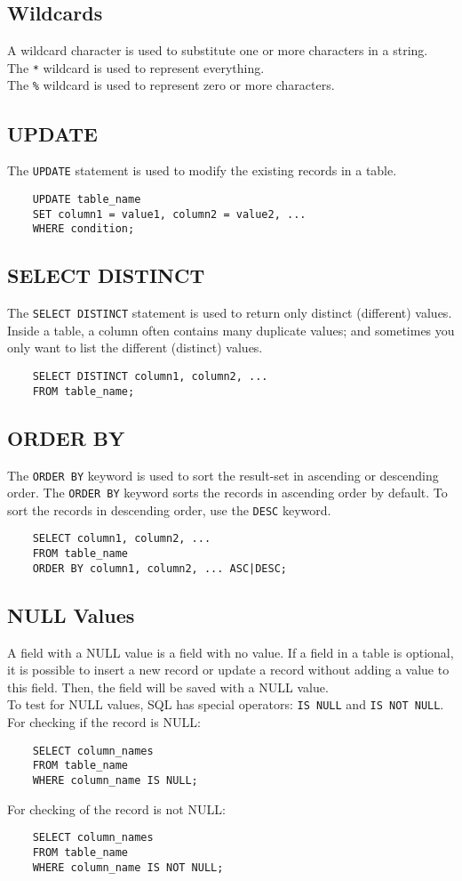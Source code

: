 \documentclass{thomasClass}
\begin{document}
\subsection{Wildcards}
A wildcard character is used to substitute one or more characters in a string.\\
The \verb|*| wildcard is used to represent everything.\\
The \verb|%| wildcard is used to represent zero or more characters.

\subsection{UPDATE}
The \verb|UPDATE| statement is used to modify the existing records in a table.
\begin{verbatim}
    UPDATE table_name
    SET column1 = value1, column2 = value2, ...
    WHERE condition;
\end{verbatim}

\subsection{SELECT DISTINCT}
The \verb|SELECT DISTINCT| statement is used to return only distinct (different) values. Inside a table, a column often contains many duplicate values; and sometimes you only want to list the different (distinct) values.
\begin{verbatim}
    SELECT DISTINCT column1, column2, ...
    FROM table_name;
\end{verbatim}

\subsection{ORDER BY}
The \verb|ORDER BY| keyword is used to sort the result-set in ascending or descending order. The \verb|ORDER BY| keyword sorts the records in ascending order by default. To sort the records in descending order, use the \verb|DESC| keyword.
\begin{verbatim}
    SELECT column1, column2, ...
    FROM table_name
    ORDER BY column1, column2, ... ASC|DESC;
\end{verbatim}

\subsection{NULL Values}
A field with a NULL value is a field with no value. If a field in a table is optional, it is possible to insert a new record or update a record without adding a value to this field. Then, the field will be saved with a NULL value.\\
To test for NULL values, SQL has special operators: \verb|IS NULL| and \verb|IS NOT NULL|.\\
For checking if the record is NULL:
\begin{verbatim}
    SELECT column_names
    FROM table_name
    WHERE column_name IS NULL;
\end{verbatim}
For checking of the record is not NULL:
\begin{verbatim}
    SELECT column_names
    FROM table_name
    WHERE column_name IS NOT NULL;
\end{verbatim}
\end{document}
